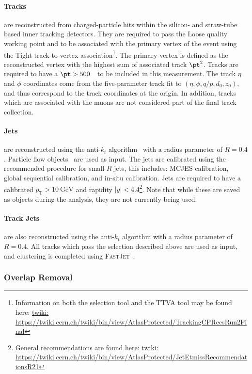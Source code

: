 \paragraph{Tracks} are reconstructed from charged-particle hits within the silicon- and straw-tube based inner tracking detectors. They are required to pass the Loose quality working point and to be associated with the primary vertex of the event using the Tight track-to-vertex association\footnote{Information on both the selection tool and the TTVA tool may be found here: \url{twiki: https://twiki.cern.ch/twiki/bin/view/AtlasProtected/TrackingCPRecsRun2Final}}.
The primary vertex is defined as the reconstructed vertex with the highest sum of associated track $\pt^2$. Tracks are required to have a $\pt>500$~\MeV~to be included in this measurement.  The track $\eta$ and $\phi$ coordinates come from the five-parameter track fit to $(\eta,\phi,q/p,d_0,z_0)$, and thus correspond to the track coordinates at the origin.
In addition, tracks which are associated with the muons are not considered part of the final track collection.

\paragraph{Jets} are reconstructed using the anti-$k_t$ algorithm~\cite{Cacciari:2008gp} with a radius parameter of $R=0.4$. Particle flow objects~\cite{Aaboud:2017aca} are used as input. The jets are calibrated using the recommended procedure for small-$R$ jets, this includes: MCJES calibration, global sequential calibration, and in-situ calibration.
Jets are required to have a calibrated $p_\text{T} > 10~\text{GeV}$ and rapidity $|y| < 4.4$\footnote{General recommendations are found here: \url{twiki: https://twiki.cern.ch/twiki/bin/view/AtlasProtected/JetEtmissRecommendationsR21}}. Note that while these are saved as objects during the analysis, they are not currently being used.

\paragraph{Track Jets} are also reconstructed using the anti-$k_t$ algorithm with a radius parameter of $R=0.4$. All tracks which pass the selection described above are used as input, and clustering is completed using \textsc{FastJet}~\cite{Cacciari:2011ma}.

\subsubsection{Overlap Removal}

